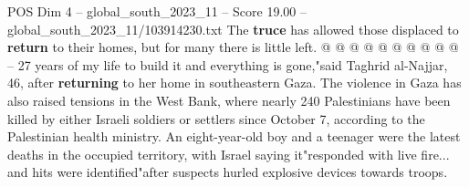 \begin{textsample}{POS Dim 4 – global\_south\_2023\_11 – Score 19.00 – global\_south\_2023\_11/103914230.txt}
The \textbf{truce} has allowed those displaced to \textbf{return} to their homes, but for many there is little left. @ @ @ @ @ @ @ @ @ @ -- 27 years of my life to build it and everything is gone,"said Taghrid al-Najjar, 46, after \textbf{returning} to her home in southeastern Gaza.
The violence in Gaza has also raised tensions in the West Bank, where nearly 240 Palestinians have been killed by either Israeli soldiers or settlers since October 7, according to the Palestinian health ministry.
An eight-year-old boy and a teenager were the latest deaths in the occupied territory, with Israel saying it"responded with live fire... and hits were identified"after suspects hurled explosive devices towards troops.

\end{textsample}
